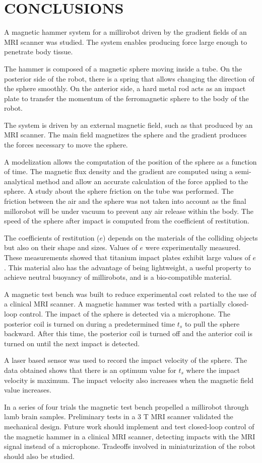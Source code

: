 \documentclass[letterpaper, 10 pt, conference]{ieeeconf}  %
\begin{document}
\section{CONCLUSIONS}
\label{conclusion}
A magnetic hammer system for a millirobot driven by the gradient fields of an MRI scanner was studied. 
The system enables producing force large enough to penetrate body tissue.\par
The hammer is composed of a magnetic sphere moving inside a tube. 
On the posterior side of the robot, there is a spring that allows changing the direction of the sphere smoothly. 
On the anterior side, a hard metal rod acts as an impact plate to transfer the momentum of the ferromagnetic sphere to the body of the robot.\par
The system is driven by an external magnetic field, such as that produced by an MRI scanner. 
The main field magnetizes the sphere and the gradient produces the forces necessary to move the sphere.\par
 A modelization allows the computation of the position of the sphere as a function of time. 
 The magnetic flux density and the gradient are computed using a semi-analytical method and allow an accurate calculation of the force applied to the sphere. A study about the sphere friction on the tube was performed. The friction between the air and the sphere was not taken into account as the final millorobot will be under vacuum to prevent any air release within the body.
 The speed of the sphere after impact is computed from the coefficient of restitution. \par
The coefficients of restitution ($e$) depends on the materials of the colliding objects but also on their shape and sizes. 
Values of $e$ were experimentally measured. 
These measurements showed that titanium impact plates exhibit large values of $e$. 
This material also has the advantage of being lightweight, a useful property to achieve neutral buoyancy of millirobots, and is a bio-compatible material.\par
A magnetic test bench was built to reduce experimental cost related to the use of a clinical MRI scanner. 
A magnetic hammer was tested with a partially closed-loop control. 
The impact of the sphere is detected via a microphone. 
The posterior coil is turned on during a predetermined time $t_s$ to pull the sphere backward.
 After this time, the posterior coil is turned off and the anterior coil is turned on until the next impact is detected.\par
A laser based sensor was used to record the impact velocity of the sphere. The data obtained shows that there is an optimum value for $t_s$ where the impact velocity is maximum. The impact velocity also increases when the magnetic field value increases.\par
	In a series of four trials the magnetic test bench propelled a millirobot through lamb brain samples. Preliminary tests in a 3 T MRI scanner validated the mechanical design. Future work should implement and test closed-loop control of the magnetic hammer in a clinical MRI scanner, detecting impacts with the MRI signal instead of a microphone. 
Tradeoffs involved in miniaturization of the robot should also be studied.
\vspace{-1.1em}
 
\end{document}
